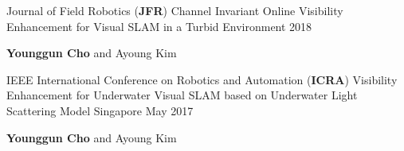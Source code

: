 \begin{cventries}
  \cventry
    {Journal of Field Robotics (\textbf{JFR})} %
    {Channel Invariant Online Visibility Enhancement for Visual SLAM in a Turbid Environment } %
    { } %
    {2018} %
    {
      \begin{cvitems} %
        \item {\textbf{Younggun Cho} and Ayoung Kim}
      \end{cvitems}
    }


  \cventry
    {IEEE International Conference on Robotics and Automation (\textbf{ICRA})} %
    {Visibility Enhancement for Underwater Visual SLAM based on Underwater Light Scattering Model } %
    {Singapore} %
    {May 2017} %
    {
      \begin{cvitems} %
        \item {\textbf{Younggun Cho} and Ayoung Kim}
      \end{cvitems}
    }


\end{cventries}











